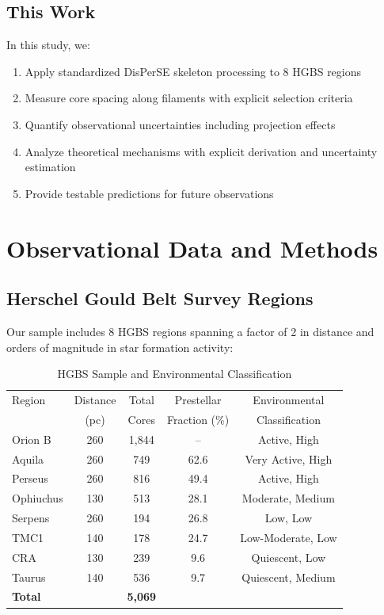 \documentclass[11pt,a4paper]{article}
\begin{document}
\subsection{This Work}

In this study, we:
\begin{enumerate}
    \item Apply standardized DisPerSE skeleton processing to 8 HGBS regions
    \item Measure core spacing along filaments with explicit selection criteria
    \item Quantify observational uncertainties including projection effects
    \item Analyze theoretical mechanisms with explicit derivation and uncertainty estimation
    \item Provide testable predictions for future observations
\end{enumerate}

\section{Observational Data and Methods}

\subsection{Herschel Gould Belt Survey Regions}

Our sample includes 8 HGBS regions spanning a factor of 2 in distance and orders of magnitude in star formation activity:

\begin{table}[H]
\centering
\caption{HGBS Sample and Environmental Classification}
\begin{tabular}{lcccc}
\toprule
Region & Distance & Total & Prestellar & Environmental \\
       & (pc)   & Cores & Fraction (\%) & Classification \\
\midrule
Orion B  & 260     & 1,844 & --       & Active, High \\
Aquila   & 260     & 749   & 62.6     & Very Active, High \\
Perseus  & 260     & 816   & 49.4     & Active, High \\
Ophiuchus& 130     & 513   & 28.1     & Moderate, Medium \\
Serpens  & 260     & 194   & 26.8     & Low, Low \\
TMC1     & 140     & 178   & 24.7     & Low-Moderate, Low \\
CRA      & 130     & 239   & 9.6      & Quiescent, Low \\
Taurus   & 140     & 536   & 9.7      & Quiescent, Medium \\
\midrule
\textbf{Total} &        & \textbf{5,069} &        &  \\
\bottomrule
\end{tabular}
\end{table}
\end{document}
